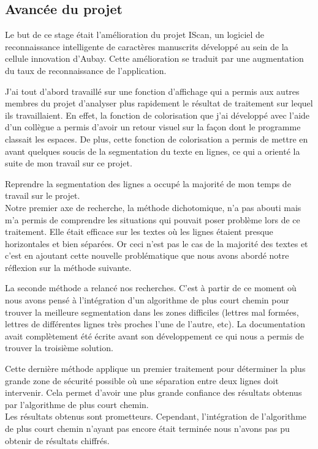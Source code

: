 \documentclass[12pt,a4paper]{article}
\begin{document}
\subsection{Avancée du projet}
Le but de ce stage était l'amélioration du projet IScan, un logiciel de reconnaissance intelligente de caractères manuscrits développé au sein de la cellule innovation d'Aubay. Cette amélioration se traduit par une augmentation du taux de reconnaissance de l'application.\bigbreak

J'ai tout d'abord travaillé sur une fonction d'affichage qui a permis aux autres membres du projet d'analyser plus rapidement le résultat de traitement sur lequel ils travaillaient. En effet, la fonction de colorisation que j'ai développé avec l'aide d'un collègue a permis d'avoir un retour visuel sur la façon dont le programme classait les espaces. De plus, cette fonction de colorisation a permis de mettre en avant quelques soucis de la segmentation du texte en lignes, ce qui a orienté la suite de mon travail sur ce projet.\bigbreak

Reprendre la segmentation des lignes a occupé la majorité de mon temps de travail sur le projet.\\
Notre premier axe de recherche, la méthode dichotomique, n'a pas abouti mais m'a permis de comprendre les situations qui pouvait poser problème lors de ce traitement. Elle était efficace sur les textes où les lignes étaient presque horizontales et bien séparées. Or ceci n'est pas le cas de la majorité des textes et c'est en ajoutant cette nouvelle problématique que nous avons abordé notre réflexion sur la méthode suivante.\bigbreak

La seconde méthode a relancé nos recherches. C'est à partir de ce moment où nous avons pensé à l'intégration d'un algorithme de plus court chemin pour trouver la meilleure segmentation dans les zones difficiles (lettres mal formées, lettres de différentes lignes très proches l'une de l'autre, etc). La documentation avait complètement été écrite avant son développement ce qui nous a permis de trouver la troisième solution.\bigbreak

Cette dernière méthode applique un premier traitement pour déterminer la plus grande zone de sécurité possible où une séparation entre deux lignes doit intervenir. Cela permet d'avoir une plus grande confiance des résultats obtenus par l'algorithme de plus court chemin.\\
Les résultats obtenus sont prometteurs. Cependant, l'intégration de l'algorithme de plus court chemin n'ayant pas encore était terminée nous n'avons pas pu obtenir de résultats chiffrés.\bigbreak
\end{document}
